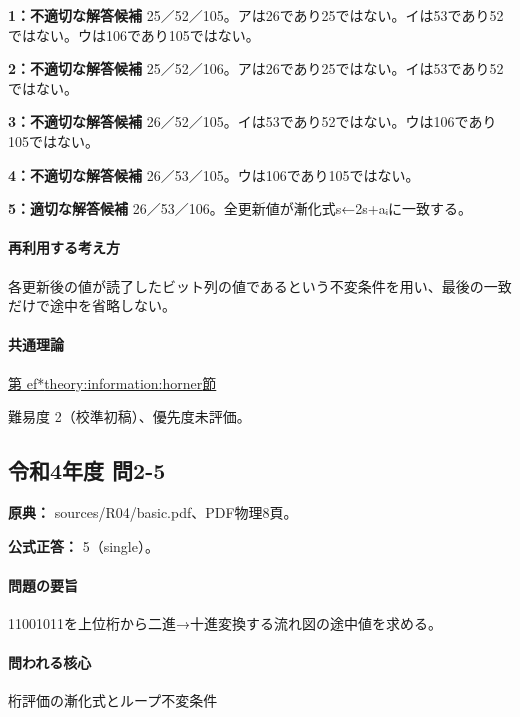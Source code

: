 \noindent\textbf{1：不適切な解答候補} 25／52／105。アは26であり25ではない。イは53であり52ではない。ウは106であり105ではない。\par

\noindent\textbf{2：不適切な解答候補} 25／52／106。アは26であり25ではない。イは53であり52ではない。\par

\noindent\textbf{3：不適切な解答候補} 26／52／105。イは53であり52ではない。ウは106であり105ではない。\par

\noindent\textbf{4：不適切な解答候補} 26／53／105。ウは106であり105ではない。\par

\noindent\textbf{5：適切な解答候補} 26／53／106。全更新値が漸化式s←2s+aᵢに一致する。\par

\paragraph{再利用する考え方} 各更新後の値が読了したビット列の値であるという不変条件を用い、最後の一致だけで途中を省略しない。

\paragraph{共通理論} \hyperref[theory:information:horner]{第
ef*{theory:information:horner}節}

\par 難易度 2（校準初稿）、優先度未評価。

\subsection{令和4年度 問2-5}
\label{q:r04-reg-basic-2-5}

\noindent\textbf{原典：} sources/R04/basic.pdf、PDF物理8頁。

\textbf{公式正答：} 5（single）。

\paragraph{問題の要旨} 11001011を上位桁から二進→十進変換する流れ図の途中値を求める。

\paragraph{問われる核心} 桁評価の漸化式とループ不変条件

